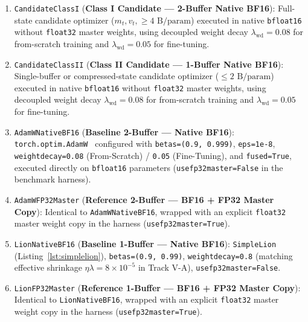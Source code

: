 \documentclass[11pt,a4paper]{article}
\renewcommand{\_}{\origunderscore\allowbreak}
\begin{document}
\begin{enumerate}[leftmargin=1.8em, itemsep=0.35em]
    \item \texttt{Candidate\_Class\_I} (\textbf{Class I Candidate --- 2-Buffer Native BF16}): Full-state candidate optimizer ($m_t, v_t, \ge 4\text{ B/param}$) executed in native \texttt{bfloat16} without \texttt{float32} master weights, using decoupled weight decay $\lambda_{\text{wd}} = 0.08$ for from-scratch training and $\lambda_{\text{wd}} = 0.05$ for fine-tuning.
    \item \texttt{Candidate\_Class\_II} (\textbf{Class II Candidate --- 1-Buffer Native BF16}): Single-buffer or compressed-state candidate optimizer ($\le 2\text{ B/param}$) executed in native \texttt{bfloat16} without \texttt{float32} master weights, using decoupled weight decay $\lambda_{\text{wd}} = 0.08$ for from-scratch training and $\lambda_{\text{wd}} = 0.05$ for fine-tuning.
    \item \texttt{AdamW\_Native\_BF16} (\textbf{Baseline 2-Buffer --- Native BF16}): \texttt{torch.optim.AdamW}~\cite{loshchilov2019adamw} configured with \texttt{betas=(0.9, 0.999)}, \texttt{eps=1e-8}, \texttt{weight\_decay=0.08} (From-Scratch) / \texttt{0.05} (Fine-Tuning), and \texttt{fused=True}, executed directly on \texttt{bfloat16} parameters (\texttt{use\_fp32\_master=False} in the benchmark harness).
    \item \texttt{AdamW\_FP32\_Master} (\textbf{Reference 2-Buffer --- BF16 + FP32 Master Copy}): Identical to \texttt{AdamW\_Native\_BF16}, wrapped with an explicit \texttt{float32} master weight copy in the harness (\texttt{use\_fp32\_master=True}).
    \item \texttt{Lion\_Native\_BF16} (\textbf{Baseline 1-Buffer --- Native BF16}): \texttt{SimpleLion}~\cite{chen2023lion} (Listing~\ref{lst:simplelion}), \texttt{betas=(0.9, 0.99)}, \texttt{weight\_decay=0.8} (matching effective shrinkage $\eta\lambda = 8 \times 10^{-5}$ in Track V-A), \texttt{use\_fp32\_master=False}.
    \item \texttt{Lion\_FP32\_Master} (\textbf{Reference 1-Buffer --- BF16 + FP32 Master Copy}): Identical to \texttt{Lion\_Native\_BF16}, wrapped with an explicit \texttt{float32} master weight copy in the harness (\texttt{use\_fp32\_master=True}).
\end{enumerate}
\end{document}
